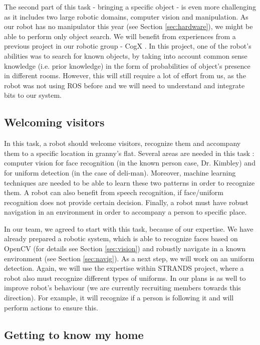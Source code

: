\documentclass[conference]{IEEEtran}
\begin{document}
The second part of this task - bringing a specific object - is even more challenging as it includes two large robotic domains, computer vision and manipulation. As our robot has no manipulator this year (see Section \ref{sec:hardware}), we might be able to perform only object search. We will benefit from experiences from a previous project in our robotic group - CogX \cite{cogx}. In this project, one of the robot's abilities was to search for known objects, by taking into account common sense knowledge (i.e. prior knowledge) in the form of probabilities of object's presence in different rooms. However, this will still require a lot of effort from us, as the robot was not using ROS before and we will need to understand and integrate bits to our system. 

\subsection{Welcoming visitors}

In this task, a robot should welcome visitors, recognize them and accompany them to a specific location in granny's flat. Several areas are needed in this task : computer vision for face recognition (in the known person case, Dr. Kimbley) and for uniform detection (in the case of deli-man). Moreover, machine learning techniques are needed to be able to learn these two patterns in order to recognize them. A robot can also benefit from speech recognition, if face/uniform recognition does not provide certain decision. Finally, a robot must have robust navigation in an environment in order to accompany a person to specific place. 

In our team, we agreed to start with this task, because of our expertise. We have already prepared a robotic system, which is able to recognize faces based on OpenCV (for details see Section \ref{sec:vision}) and robustly navigate in a known environment (see Section \ref{sec:navig}). As a next step, we will work on an uniform detection. Again, we will use the expertise within STRANDS project, where a robot also must recognize different types of uniforms. In our plans is as well to improve robot's behaviour (we are currently recruiting members towards this direction). For example, it will recognize if a person is following it and will perform actions to ensure this.

\subsection{Getting to know my home}
\end{document}
